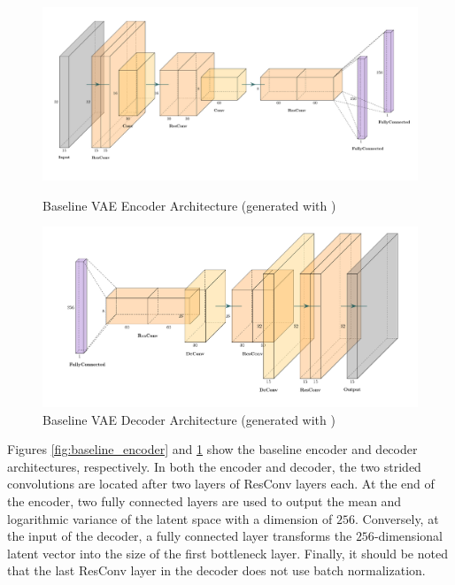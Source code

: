 \begin{figure}[htb]
    \centering
    \begin{minipage}[b]{\textwidth}
        \centering
        \includegraphics[width=\textwidth]{figures/model_architecture/build/baseline_vae_encoder.pdf}
        \caption{Baseline VAE Encoder Architecture (generated with \parencite{NNVisualization})}
        \label{fig:baseline_encoder}
    \end{minipage}
    \begin{minipage}[b]{\textwidth}
        \centering
        \includegraphics[width=\textwidth]{figures/model_architecture/build/baseline_vae_decoder.pdf}
        \caption{Baseline VAE Decoder Architecture (generated with \parencite{NNVisualization})}
        \label{fig:baseline_decoder}
    \end{minipage}
\end{figure}

Figures \ref{fig:baseline_encoder} and \ref{fig:baseline_decoder} show the baseline encoder and decoder architectures, respectively.
In both the encoder and decoder, the two strided convolutions are located after two layers of \gls{ResConv} layers each.
At the end of the encoder, two fully connected layers are used to output the mean and logarithmic variance of the latent space with a dimension of $256$.
Conversely, at the input of the decoder, a fully connected layer transforms the $256$-dimensional latent vector into the size of the first bottleneck layer.
Finally, it should be noted that the last \gls{ResConv} layer in the decoder does not use batch normalization.

